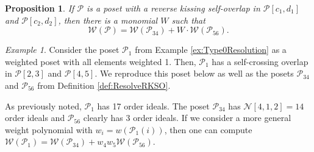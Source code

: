 \documentclass[12pt, letterpaper,table]{amsart}
\newtheorem{prop}[theorem]{Proposition}
\theoremstyle{remark}
\newtheorem{example}[theorem]{Example}
\newcommand{\calP}{\mathcal{P}}
\newcommand{\highlight}[1]{\colorbox{gray!15}{\small{#1}}}
\begin{document}
\begin{prop}\cite[Proposition 8.12]{BG}\label{prop:RKO}
If $\calP$ is a poset with a reverse kissing self-overlap in $\calP[c_1,d_1]$ and $\calP[c_2,d_2]$, then there is a monomial $W$ such that \[
\mathcal{W}(\calP) = \mathcal{W}(\calP_{34}) + W\cdot\mathcal{W}(\calP_{56}).
\]
\end{prop}

\begin{example}
Consider the poset $\calP_1$ from Example \ref{ex:Type0Resolution} as a weighted poset with all elements weighted 1. Then, $\calP_1$ has a self-crossing overlap in $\calP[2,3]$ and $\calP[4,5]$. We reproduce this poset below as well as the posets $\calP_{34}$ and $\calP_{56}$ from Definition \ref{def:ResolveRKSO}.

\begin{center}
\end{center}

As previously noted, $\calP_1$ has 17 order ideals. The poset $\calP_{34}$ has $\mathcal{N}[4,1,2] = 14$ order ideals and $\calP_{56}$ clearly has 3 order ideals. 
If we consider a more general weight polynomial with $w_i = w(\calP_1(i))$, then one can compute  $\mathcal{W}(\calP_1) = \mathcal{W}(\calP_{34}) + w_4 w_5 \mathcal{W}(\calP_{56})$.
\end{example}
\end{document}
